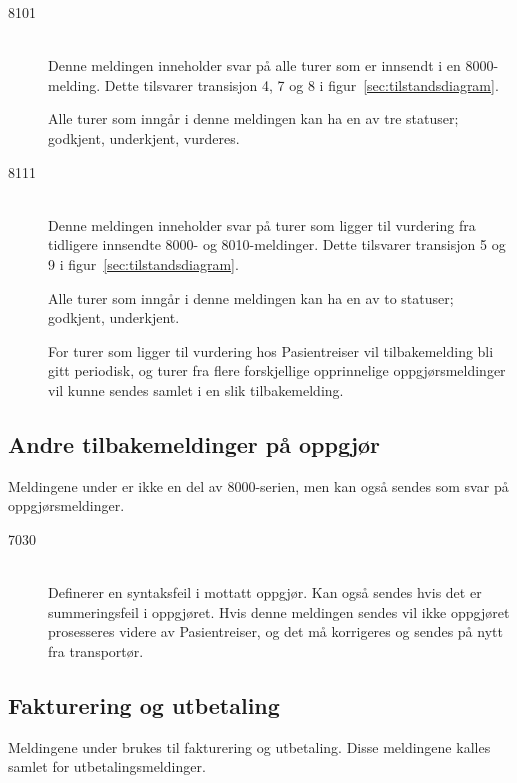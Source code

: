 \documentclass[a4paper,titlepage,norsk,11pt]{article}
\begin{document}
\begin{description}

	\item[8101] \hfill \\
	Denne meldingen inneholder svar på alle turer som er innsendt i en 8000-melding. Dette tilsvarer transisjon 4, 7 og 8 i figur~\ref{sec:tilstandsdiagram}.

	Alle turer som inngår i denne meldingen kan ha en av tre statuser; godkjent, underkjent, vurderes.

	\item[8111] \hfill \\
	Denne meldingen inneholder svar på turer som ligger til vurdering fra tidligere innsendte 8000- og 8010-meldinger. Dette tilsvarer transisjon 5 og 9 i figur~\ref{sec:tilstandsdiagram}.

	Alle turer som inngår i denne meldingen kan ha en av to statuser; godkjent, underkjent.

	For turer som ligger til vurdering hos Pasientreiser vil tilbakemelding bli gitt periodisk, og turer fra flere forskjellige opprinnelige oppgjørsmeldinger vil kunne sendes samlet i en slik tilbakemelding.

\end{description}

\subsection{Andre tilbakemeldinger på oppgjør}

Meldingene under er ikke en del av 8000-serien, men kan også sendes som svar på oppgjørsmeldinger.

\begin{description}

	\item[7030] \hfill \\
	Definerer en syntaksfeil i mottatt oppgjør. Kan også sendes hvis det er summeringsfeil i oppgjøret. Hvis denne meldingen sendes vil ikke oppgjøret prosesseres videre av Pasientreiser, og det må korrigeres og sendes på nytt fra transportør.

\end{description}

\subsection{Fakturering og utbetaling}

Meldingene under brukes til fakturering og utbetaling. Disse meldingene kalles samlet for utbetalingsmeldinger.
\end{document}
